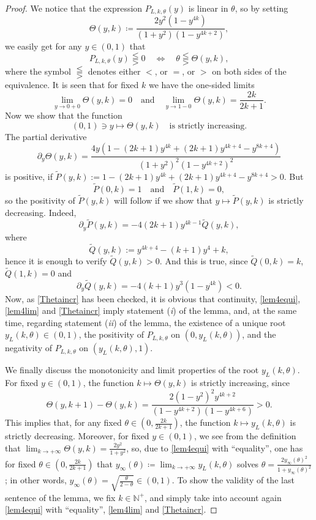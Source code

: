\documentclass[a4paper]{article}
\newcommand{\te}{\theta}
\newcommand{\yl}{y_L(k,\theta)}
\newcommand{\nplus}{\mathbb{N}^+}
\newcommand{\Pol}{P_{L,k,\te}(y)}
\begin{document}
\begin{proof}
We notice that the expression $\Pol$ is linear in $\te$, so by setting 
\[
\Theta(y,k)\coloneqq\frac{2 y^2 \left(1-y^{4 k}\right)}{\left(1+y^2\right) \left(1-y^{4 k+2}\right)},
\]
we easily get for any $y\in(0,1)$ that
\begin{equation}\label{lem4equi}
\Pol \lesseqqgtr 0\quad \Longleftrightarrow \quad \te\lesseqqgtr\Theta(y,k),
\end{equation}
where the symbol $\lesseqqgtr$ denotes either $<$, or $=$, or $>$ on both sides of the equivalence. It is
seen that for fixed $k$ we have the one-sided limits
\begin{equation}\label{lem4lim}
\lim_{y\to 0+0}\Theta(y,k)=0\quad\text{and}\quad\lim_{y\to 1-0}\Theta(y,k)=\frac{2k}{2k+1}.
\end{equation}
Now we show that the function
\begin{equation}\label{Thetaincr}
(0,1)\ni y\mapsto \Theta(y,k)\quad\text{is strictly increasing.}
\end{equation}
The partial derivative
\[
\partial_y\Theta(y,k)=\frac{4 y \left(1-(2 k+1) y^{4 k}+(2 k+1) y^{4 k+4}-y^{8 k+4}\right)}{\left(1+y^2\right)^2 \left(1-y^{4 k+2}\right)^2}
\]
is positive, if $\widetilde{P}(y,k):=1-(2 k+1) y^{4 k}+(2 k+1) y^{4 k+4}-y^{8 k+4}>0$. But 
\[
\widetilde{P}(0,k)=1\quad\text{and}\quad\widetilde{P}(1,k)=0,
\]
so the positivity of $\widetilde{P}(y,k)$ will follow if we show that $y\mapsto\widetilde{P}(y,k)$ is strictly decreasing. Indeed,
\[
\partial_y\widetilde{P}(y,k)=-4 (2 k+1) y^{4 k-1} \widetilde{Q}(y,k),
\]
where
\[
\widetilde{Q}(y,k):=y^{4 k+4}-(k+1) y^4+k,
\]
hence it is enough to verify $\widetilde{Q}(y,k)>0$. And this is true, since $\widetilde{Q}(0,k)=k$, $\widetilde{Q}(1,k)=0$ and
\[
\partial_y \widetilde{Q}(y,k)=-4 (k+1) y^3 \left(1-y^{4 k}\right)<0.
\]
Now, as \eqref{Thetaincr} has been checked, it is obvious that continuity, \eqref{lem4equi}, \eqref{lem4lim} and \eqref{Thetaincr} imply statement (\textit{i}) of the lemma, and, at the same time, regarding statement (\textit{ii}) of the lemma, the existence of a unique root $\yl\in(0,1)$, the positivity of $P_{L,k,\te}$ on $(0,\yl)$, and the negativity of $P_{L,k,\te}$ on $(\yl,1)$.

We finally discuss the monotonicity and limit properties of the root $\yl$. For fixed $y\in(0,1)$, the function $k\mapsto\Theta(y,k)$ is strictly increasing, since
\[
\Theta(y,k+1)-\Theta(y,k)=\frac{2 \left(1-y^2\right)^2 y^{4 k+2}}{\left(1-y^{4 k+2}\right) \left(1-y^{4
   k+6}\right)}>0.
\]
This implies that, for any fixed $\te\in\left(0,\frac{2k}{2k+1}\right)$, the function $k\mapsto\yl$ is strictly decreasing. Moreover, for fixed $y\in(0,1)$, we see from the definition that $\lim_{k\to+\infty} \Theta(y,k)=\frac{2 y^2}{1+y^2}$,
so, due to \eqref{lem4equi} with ``equality'', one has for fixed $\te\in\left(0,\frac{2k}{2k+1}\right)$ that $y_{\infty}(\te)\coloneqq\lim_{k\to+\infty} \yl$ solves $\te=\frac{2 y_{\infty}(\te)^2}{1+y_{\infty}(\te)^2}$; in other words, $y_{\infty}(\te)=\sqrt{\frac{\te}{2-\te}}\in(0,1)$. To show the validity of the last sentence of the lemma, we fix $k\in\nplus$, and simply take into account again \eqref{lem4equi} with ``equality'', \eqref{lem4lim} and \eqref{Thetaincr}.
\end{proof}
\end{document}
